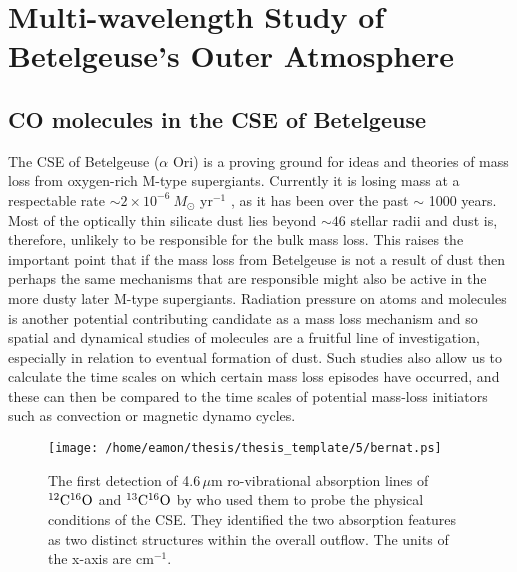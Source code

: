 
\chapter{Multi-wavelength Study of Betelgeuse's Outer Atmosphere} \label{chap:5}

\section{CO molecules in the CSE of Betelgeuse}\label{sec:5.1}
The CSE of Betelgeuse ($\alpha$ Ori) is a proving ground for ideas and theories of mass loss from oxygen-rich M-type supergiants. Currently it is losing mass at a respectable rate $\sim 2\times 10^{-6} \ M_{\odot}$ yr${}^{-1}$ \citep{harper_2001}, as it has been over the past $\sim$ 1000 years. Most of the optically thin silicate dust lies beyond $\sim 46$ stellar radii \citep{danchi_1994} and dust is, therefore, unlikely to be responsible for the bulk mass loss. This raises the important point that if the mass loss from Betelgeuse is not a result of dust then perhaps the same mechanisms that are responsible might also be active in the more dusty later M-type supergiants. Radiation pressure on atoms and molecules is another potential contributing candidate as a mass loss mechanism and so spatial and dynamical studies of molecules are a fruitful line of investigation, especially in relation to eventual formation of dust. Such studies also allow us to calculate the time scales on which certain mass loss episodes have occurred, and these can then be compared to the time scales of potential mass-loss initiators such as convection or magnetic dynamo cycles.

\begin{figure}[!ht]
\centering 
          \texttt{[image: /home/eamon/thesis/thesis\_template/5/bernat.ps]}
\caption[The first detection of the ro-vibrational absorption lines of $\rm{{}^{12}C^{16}O}$ and $\rm{{}^{13}C^{16}O}$]{The first detection of 4.6\,$\mu$m ro-vibrational absorption lines of $\rm{{}^{12}C^{16}O}$ and $\rm{{}^{13}C^{16}O}$ by \cite{bernat_1979} who used them to probe the physical conditions of the CSE. They identified the two absorption features as two distinct structures within the overall outflow. The units of the x-axis are cm$^{-1}$.}
\label{fig:5.1}
\end{figure}

